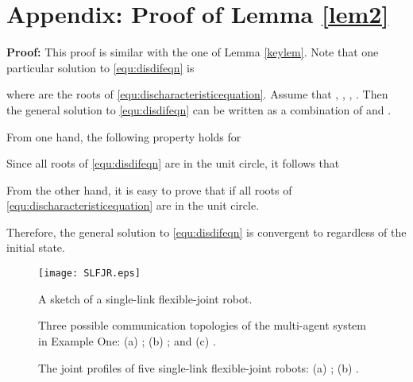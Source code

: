 \documentclass[12pt,draftcls,onecolumn]{IEEEtran}
\begin{document}
\section*{Appendix: Proof of Lemma \ref{lem2}}
\textbf{Proof:}  This proof is similar with the one of Lemma \ref{keylem}. Note that one particular solution to \eqref{equ:disdifeqn} is

where  are the roots of \eqref{equ:discharacteristicequation}. Assume that , , ,  . Then the general solution  to \eqref{equ:disdifeqn} can be written as a combination of  and  .

From one hand, the following property holds for 

Since all roots of \eqref{equ:disdifeqn} are in the unit circle, it follows that


From the other hand, it is easy to prove that   if all roots of \eqref{equ:discharacteristicequation} are in the unit circle.

Therefore, the general solution to \eqref{equ:disdifeqn} is convergent to  regardless of the initial state. 
\newpage


\newpage
\listoffigures
\newpage
\begin{figure}[t]
\centering
\texttt{[image: SLFJR.eps]}
  \caption{A sketch of a single-link flexible-joint robot.}\label{fig:robotsketch}
\end{figure}

\begin{figure}[t]
\centering {}
\hspace{0.1cm}
\hspace{0.1cm}
  \caption{Three possible communication topologies of the multi-agent system in Example One: (a) ; (b) ; and (c) .}\label{fig:topology}
\end{figure}

\begin{figure}[t]
\centering {}
  \caption{The joint profiles of five single-link flexible-joint robots: (a) ; (b)  .}\label{fig:joint1}
\end{figure}
\end{document}
